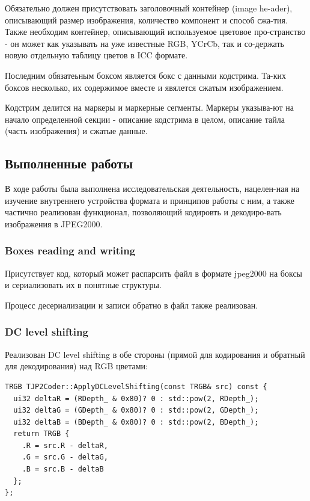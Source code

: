 \documentclass[a4paper]{article}
\newenvironment{code}{\captionsetup{type=listing}}{}
\begin{document}
  Обязательно должен присутствовать заголовочный контейнер (image he-ader), описывающий размер изображения,
  количество компонент и способ сжа-тия. Также необходим контейнер, описывающий
  используемое цветовое про-странство - он может как указывать на уже известные
  RGB, YCrCb, так и со-держать новую отдельную таблицу цветов в ICC формате.

  Последним обязатеьным боксом является бокс с данными кодстрима. Та-ких боксов
  несколько, их содержимое вместе и явялется сжатым изображением.

  Кодстрим делится на маркеры и маркерные сегменты. Маркеры указыва-ют на начало
  определенной секции - описание кодстрима в целом, описание тайла (часть изображения)
  и сжатые данные.

  \subsection{Выполненные работы}

  В ходе работы была выполнена исследовательская деятельность, нацелен-ная
  на изучение внутреннего устройства формата и принципов работы с ним, а также
  частично реализован функционал, позволяющий кодировть и декодиро-вать изображения в JPEG2000.

  \subsubsection{Boxes reading and writing}

  Присутствует код, который может распарсить файл в формате jpeg2000 на боксы
  и сериализовать их в понятные структуры.

  Процесс десериализации и записи обратно в файл также реализован.

  \subsubsection{DC level shifting}

  Реализован DC level shifting в обе стороны (прямой для кодирования и
  обратный для декодирования) над RGB цветами:

  \begin{code}
    \begin{verbatim}
TRGB TJP2Coder::ApplyDCLevelShifting(const TRGB& src) const {
  ui32 deltaR = (RDepth_ & 0x80)? 0 : std::pow(2, RDepth_);
  ui32 deltaG = (GDepth_ & 0x80)? 0 : std::pow(2, GDepth_);
  ui32 deltaB = (BDepth_ & 0x80)? 0 : std::pow(2, BDepth_);
  return TRGB {
    .R = src.R - deltaR,
    .G = src.G - deltaG,
    .B = src.B - deltaB
  };
};
    \end{verbatim}
  \end{code}
\end{document}
